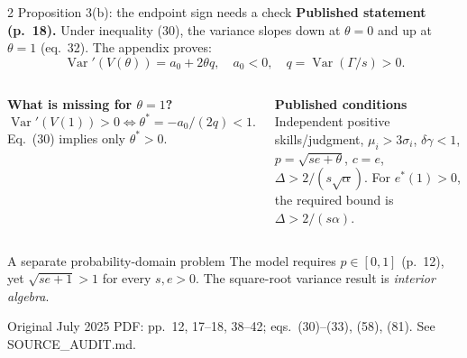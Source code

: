 \documentclass[aspectratio=169,11pt]{beamer}
\begin{document}
\begin{frame}{2 \textperiodcentered{} Proposition 3(b): the endpoint sign needs a check}
  \small
  \textbf{Published statement (p.~18).} Under inequality (30),
  the variance slopes down at $\theta=0$ and up at $\theta=1$
  (eq.~32). The appendix proves:
  \[
    \operatorname{Var}'(V(\theta))=a_0+2\theta q,\quad
    a_0<0,\quad q=\operatorname{Var}(\Gamma/s)>0.
  \]

  \begin{columns}[T,onlytextwidth]
    \textbf{What is missing for $\theta=1$?}
    \[
      \operatorname{Var}'(V(1))>0
      \iff\theta^*=-a_0/(2q)<1.
    \]
    Eq.~(30) implies only $\theta^*>0$.

    \textbf{Published conditions}
    {\footnotesize Independent positive skills/judgment,
    $\mu_i>3\sigma_i$, $\delta\gamma<1$,
    $p=\sqrt{se+\theta}$, $c=e$,
    $\Delta>2/(s\sqrt\alpha)$.}
    For $e^*(1)>0$, the required bound is
    $\Delta>2/(s\alpha)$.
  \end{columns}

  \begin{alertblock}{A separate probability-domain problem}
    \small The model requires $p\in[0,1]$ (p.~12),
    yet $\sqrt{se+1}>1$ for every $s,e>0$.
    The square-root variance result is \emph{interior algebra}.
  \end{alertblock}
  {\scriptsize\color{gray}Original July 2025 PDF: pp.~12, 17--18,
  38--42; eqs.~(30)--(33), (58), (81). See SOURCE\_AUDIT.md.}
\end{frame}
\end{document}
